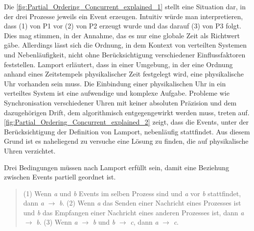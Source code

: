 Die \cref{fig:Partial_Ordering_Concurrent_explained_1} stellt eine Situation dar, in der drei Prozesse jeweils ein Event erzeugen. Intuitiv würde man interpretieren, dass (1) von P1 vor (2) von P2 erzeugt wurde und das darauf (3) von P3 folgt. Dies mag stimmen, in der Annahme, das es nur eine globale Zeit als Richtwert gäbe. Allerdings lässt sich die Ordnung, in dem Kontext von verteilten Systemen und Nebenläufigkeit, nicht ohne Berücksichtigung verschiedener Einflussfaktoren feststellen. Lamport erläutert, dass in einer Umgebung, in der eine Ordnung anhand eines Zeitstempels physikalischer Zeit festgelegt wird, eine physikalische Uhr vorhanden sein muss. Die Einbindung einer physikalischen Uhr in ein verteiltes System ist eine aufwendige und komplexe Aufgabe. Probleme wie Synchronisation verschiedener Uhren mit keiner absoluten Präzision und dem dazugehörigen Drift, dem algorithmisch entgegengewirkt werden muss, treten auf. \cref{fig:Partial_Ordering_Concurrent_explained_2} zeigt, dass die Events, unter der Berücksichtigung der Definition von Lamport, nebenläufig stattfindet.  Aus diesem Grund ist es naheliegend zu versuche eine Lösung zu finden, die auf physikalische Uhren verzichtet.


Drei Bedingungen müssen nach Lamport erfüllt sein, damit eine Beziehung zwischen Events partiell geordnet ist. 
\begin{quote}
	\cbstart
	\glqq (1) Wenn \emph{a} und \emph{b} Events im selben Prozess sind und \emph{a} vor \emph{b} stattfindet, dann \emph{a} $\rightarrow$ \emph{b}. (2) Wenn \emph{a} das Senden einer Nachricht eines Prozesses ist und \emph{b} das Empfangen einer Nachricht eines anderen Prozesses ist, dann \emph{a} $\rightarrow$ \emph{b}. (3) Wenn \emph{a} $\rightarrow$ \emph{b} und \emph{b} $\rightarrow$ \emph{c}, dann \emph{a} $\rightarrow$ \emph{c}.\grqq \:
	\cbend
\end{quote}

